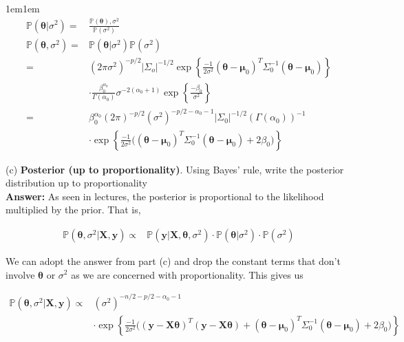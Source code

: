 \documentclass[11pt]{article}
\begin{document}
\begin{adjustwidth}{1em}{1em}
        \begin{align*}
            \mathbb{P}(\boldsymbol{\theta} | \sigma^2) 
            =& \frac{\mathbb{P}(\boldsymbol{\theta}), \sigma^2}{\mathbb{P}(\sigma^2)} \\ 
            \mathbb{P}(\boldsymbol{\theta}, \sigma^2) 
            =& \mathbb{P}(\boldsymbol{\theta} | \sigma^2) \mathbb{P}(\sigma^2) \\ 
            =& (2\pi\sigma^2)^{-p/2}|\Sigma_o|^{-1/2} \exp
            \left\{\frac{-1}{2\sigma^{2}}(\boldsymbol{\theta} - \boldsymbol{\mu}_0)^T \Sigma_0^{-1}
            (\boldsymbol{\theta} - \boldsymbol{\mu}_0)\right\} \\ 
            & \cdot \frac{\beta_0^{\alpha_0}}{\Gamma(\alpha_0)}\sigma^{-2(\alpha_0 + 1)}
            \exp\left\{\frac{-\beta_0}{\sigma^2}\right\} \\ 
            =& \beta_0^{\alpha_0}(2\pi)^{-p/2}(\sigma^2)^{-p/2 - \alpha_0 -
            1}|\Sigma_0|^{-1/2}(\Gamma(\alpha_0))^{-1} \\ 
            & \cdot \exp\left\{\frac{-1}{2\sigma^2}\Bigg(
            (\boldsymbol{\theta} - \boldsymbol{\mu}_0)^T \Sigma_0^{-1}(\boldsymbol{\theta} -
            \boldsymbol{\mu}_0) + 2\beta_0\Bigg)\right\}
        \end{align*}

        (c) \textbf{Posterior (up to proportionality)}. Using Bayes' rule, write the posterior
        distribution up to proportionality \\ 

        \textbf{Answer:} As seen in lectures, the posterior is proportional to the likelihood
        multiplied by the prior. That is,

        \begin{align*}
            \mathbb{P}(\boldsymbol{\theta}, \sigma^2 | \mathbf{X}, \mathbf{y}) 
            \propto& \mathbb{P}(\mathbf{y}| \mathbf{X}, \boldsymbol{\theta}, \sigma^2) \cdot
            \mathbb{P}(\boldsymbol{\theta} | \sigma^2) \cdot \mathbb{P}(\sigma^2)
        \end{align*}

        We can adopt the answer from part (c) and drop the constant terms that don't involve
        $\boldsymbol{\theta}$ or $\sigma^2$ as we are concerned with proportionality. This gives us

        \begin{align*}
            \mathbb{P}(\boldsymbol{\theta}, \sigma^2 | \mathbf{X,y})
            \propto& (\sigma^2)^{-n / 2 - p / 2 - \alpha_0 - 1} \\
                   & \cdot\exp\left\{\frac{-1}{2\sigma^2}\Bigg((\mathbf{y} -
            \mathbf{X}\boldsymbol{\theta})^T(\mathbf{y} - \mathbf{X}\boldsymbol{\theta}) +
            (\boldsymbol{\theta} - \boldsymbol{\mu}_0)^T \Sigma_0^{-1} (\boldsymbol{\theta} -
            \boldsymbol{\mu}_0) + 2\beta_0\Bigg)\right\}
        \end{align*}


\end{adjustwidth}
\end{document}
